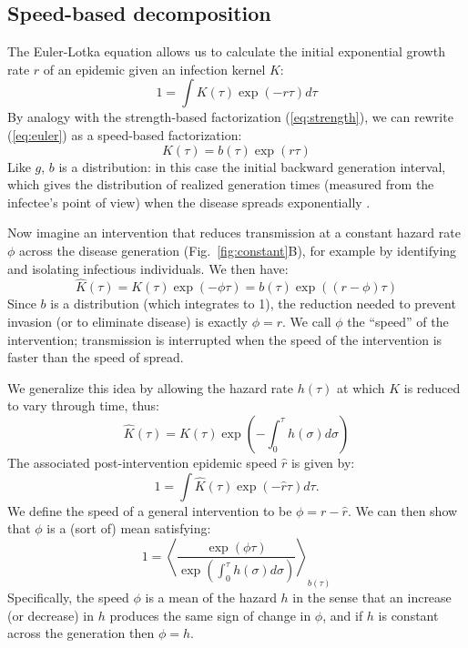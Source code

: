 \documentclass[12pt]{article}\usepackage[]{graphicx}\usepackage[]{color}
\newcommand{\figref}[1]{Fig.~\ref{fig:#1}}
\newcommand{\eqref}[1]{(\ref{eq:#1})}
\newcommand{\eqlab}[1]{\label{eq:#1}}
\begin{document}
\subsection{Speed-based decomposition}

The Euler-Lotka equation allows us to calculate the initial exponential growth rate $r$ of an epidemic given an infection kernel $K$:
\begin{equation}
	1 = \int K(\tau) \exp(-r\tau) d\tau
	\eqlab{euler}
\end{equation}
By analogy with the strength-based factorization \eqref{strength}, we can rewrite \eqref{euler} as a speed-based factorization:
\begin{equation}
K(\tau) = b(\tau)\exp(r\tau)
\end{equation}
Like $g$, $b$ is a distribution: in this case the initial backward generation interval, which gives the distribution of realized generation times (measured from the infectee's point of view) when the disease spreads exponentially \citep{champredon2015intrinsic, britton2019estimation}.

Now imagine an intervention that reduces transmission at a constant hazard rate $\phi$ across the disease generation (\figref{constant}B), for example by identifying and isolating infectious individuals.
We then have:
\begin{equation}
	\hat K(\tau) = K(\tau)\exp(-\phi\tau) = b(\tau)\exp((r-\phi)\tau)
\end{equation}
Since $b$ is a distribution (which integrates to 1), the reduction needed to prevent invasion (or to eliminate disease)  is exactly $\phi=r$. 
We call $\phi$ the ``speed'' of the intervention; transmission is interrupted when the speed of the intervention is faster than the speed of spread.

We generalize this idea by allowing the hazard rate $h(\tau)$ at which $K$ is reduced to vary through time, thus:
\begin{equation}
	\hat K(\tau) = K(\tau) \exp\left(-\int_0^\tau h(\sigma) d\sigma\right)
\end{equation}
The associated post-intervention epidemic speed $\hat r$ is given by:
\begin{equation}
	1 = \int \hat K(\tau) \exp(-\hat r\tau) d\tau.	
\end{equation}
We define the speed of a general intervention to be $\phi = r - \hat r$. 
We can then show that $\phi$ is a (sort of) mean satisfying:
\begin{equation}
	1 = \left\langle \frac{\exp(\phi \tau) }{\exp\left(\int_0^\tau h(\sigma) d\sigma\right)} \right\rangle_{b(\tau)}
\end{equation}
Specifically, the speed $\phi$ is a mean of the hazard $h$ in the sense that an increase (or decrease) in $h$ produces the same sign of change in $\phi$, and if $h$ is constant across the generation then $\phi=h$.
\end{document}

